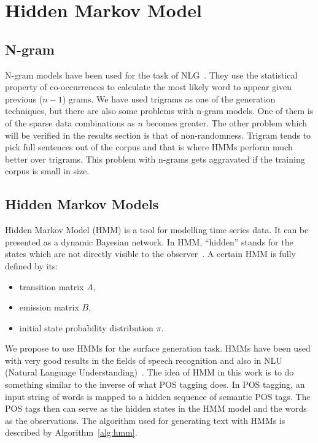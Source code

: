 \documentclass[a4paper,12pt]{article}
\begin{document}
\section{Hidden Markov Model}
\label{sec:method}

\subsection{N-gram}
N-gram models have been used for the task of NLG~\cite{nlgngram}. They
use the statistical property of co-occurrences to calculate the most likely word
to appear given previous ($n-1$) grams. We have used trigrams as one of the
generation techniques, but there are also some problems with n-gram models. One
of them is of the sparse data combinations as $n$ becomes greater. The other
problem which will be verified in the results section is that of non-randomness.
Trigram tends to pick full sentences out of the corpus and that is where HMMs
perform much better over trigrams. This problem with n-grams gets aggravated if
the training corpus is small in size. 


\subsection{Hidden Markov Models}
Hidden Markov Model (HMM) is a tool for modelling time series data.
It can be presented as a dynamic Bayesian network. In HMM, ``hidden''
stands for the states which are not directly visible to the observer~\cite{hmm}.
A certain HMM is fully defined by its:
\begin{itemize}
  \item transition matrix $A$,
  \item emission matrix $B$,
  \item initial state probability distribution $\pi$.
\end{itemize}

We propose to use HMMs for the surface generation task. HMMs have been used
with very good results in the fields of speech recognition and also in NLU
(Natural Language Understanding)~\cite{hmmsr}. The idea of HMM in this work is
to do something similar to the inverse of what POS tagging does. In POS
tagging, an input string of words is mapped to a hidden sequence of semantic POS
tags. The POS tags then can serve as the hidden states in the HMM model and the
words as the observations. The algorithm used for generating text with HMMs is
described by Algorithm~\ref{alg:hmm}.
\end{document}
